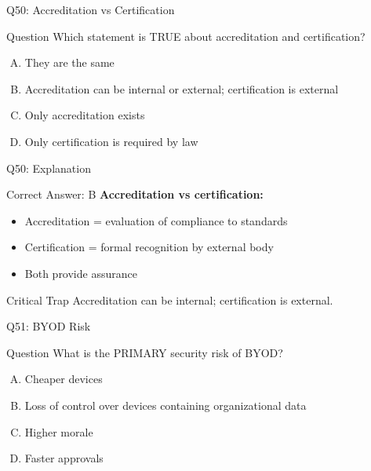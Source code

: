 \documentclass{beamer}
\begin{document}
	\begin{frame}{Q50: Accreditation vs Certification}
		\begin{block}{Question}
			Which statement is TRUE about accreditation and certification?
		\end{block}
		\begin{enumerate}[(A)]
			\item They are the same
			\item Accreditation can be internal or external; certification is external
			\item Only accreditation exists
			\item Only certification is required by law
		\end{enumerate}
	\end{frame}
	
	\begin{frame}{Q50: Explanation}
		\begin{block}{Correct Answer: B}
			\textbf{Accreditation vs certification:}
			\begin{itemize}
				\item Accreditation = evaluation of compliance to standards
				\item Certification = formal recognition by external body
				\item Both provide assurance
			\end{itemize}
		\end{block}
		\begin{alertblock}{Critical Trap}
			Accreditation can be internal; certification is external.
		\end{alertblock}
	\end{frame}
	
	\begin{frame}{Q51: BYOD Risk}
		\begin{block}{Question}
			What is the PRIMARY security risk of BYOD?
		\end{block}
		\begin{enumerate}[(A)]
			\item Cheaper devices
			\item Loss of control over devices containing organizational data
			\item Higher morale
			\item Faster approvals
		\end{enumerate}
	\end{frame}
	
\end{document}
